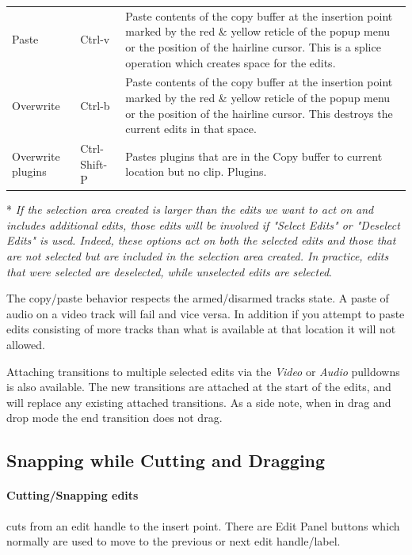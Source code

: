\begin{longtable}{p{}
    p{} p{}}
    Paste  & Ctrl-v & Paste contents of the copy buffer at the
                      insertion point marked by the red \& yellow
                      reticle of the popup menu or the position of
                      the hairline cursor. This is a splice
                      operation which creates space for the edits.\\

    Overwrite & Ctrl-b & Paste contents of the copy buffer at the
                         insertion point marked by the red \& yellow
                         reticle of the popup menu or the position
                         of the hairline cursor. This destroys the
                         current edits in that space.\\

    Overwrite plugins & Ctrl-Shift-P & Pastes plugins that are in the Copy
                               buffer to current location but no
                               clip. Plugins.\\
    \bottomrule
  \end{longtable}
\renewcommand{\arraystretch}{1}

* \textit{If the selection area created is larger than the edits we want to act on and includes additional edits, those edits will be involved if "Select Edits" or "Deselect Edits" is used. Indeed, these options act on both the selected edits and those that are not selected but are included in the selection area created. In practice, edits that were selected are deselected, while unselected edits are selected}.

The copy/paste behavior respects the armed/disarmed tracks
state.  A paste of audio on a video track will fail and vice versa.
In addition if you attempt to paste edits consisting of more tracks
than what is available at that location it will not allowed.

Attaching transitions to multiple selected edits via the \textit{Video} or
\textit{Audio} pulldowns is also available.  The new transitions are attached
at the start of the edits, and will replace any existing attached
transitions.  As a side note, when in drag and drop mode the end
transition does not drag.

\subsection{Snapping while Cutting and Dragging}%
\label{syb:snapping_cutting_dragging}

\paragraph{Cutting/Snapping edits}  cuts from an edit handle to the
insert point.  There are Edit Panel buttons which normally are used
to move to the previous or next edit handle/label.

